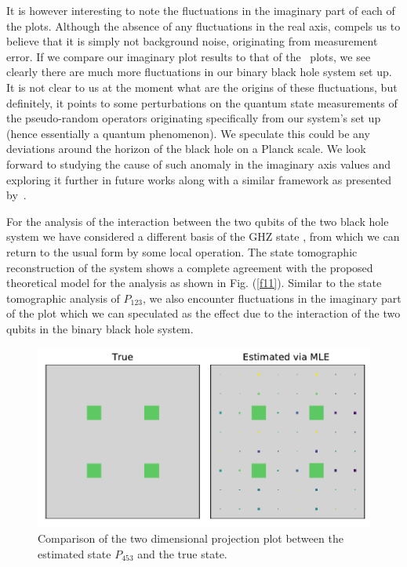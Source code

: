 \documentclass[fleqn,usenatbib]{mnras}
\begin{document}
It is however interesting to note the fluctuations in the imaginary part of each of the plots. Although the absence of any fluctuations in the real axis, compels us to believe that it is simply not background noise, originating from measurement error.    If we compare our imaginary plot results to that of the~\citep{monogamy} plots, we see clearly there are much more fluctuations in our binary black hole system set up. It is not clear to us at the moment what are the origins of these fluctuations, but definitely, it points to some perturbations on the quantum state measurements of the pseudo-random operators originating specifically from our system's set up (hence essentially a quantum phenomenon). We speculate this could be any deviations around the horizon of the black hole on a Planck scale. We look forward to studying the cause of such anomaly in the imaginary axis values and exploring it further in future works along with a similar framework as presented by~\citep{echo}. 

For the analysis of the interaction between the two qubits of the two black hole system  we have considered a different basis of the GHZ state \citep{mcunha}, from which we can return to the usual form by some local operation. The state tomographic reconstruction of the system shows a complete agreement with the proposed theoretical model for the analysis as shown in Fig. (\ref{f11}).  Similar to the state tomographic analysis of $P_{123}$, we also encounter fluctuations in the imaginary part of the plot which we can  speculated as the effect due to the interaction of the two qubits in the binary black hole system.

\begin{figure}
\centering
	\includegraphics[width=\columnwidth]{plots/Estimated_interaction.pdf}
    \caption{Comparison of the two dimensional projection plot between the estimated state $P_{453}$ and the true state.}
    \label{fX}
\end{figure}
\end{document}
